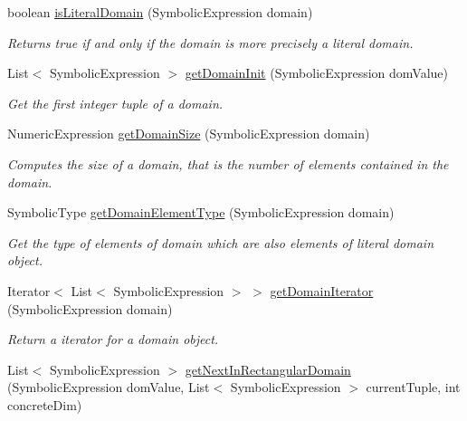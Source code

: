 \begin{DoxyCompactItemize}
boolean \hyperlink{interfaceedu_1_1udel_1_1cis_1_1vsl_1_1civl_1_1dynamic_1_1IF_1_1SymbolicUtility_a1cd347558a2c39a4364292e5c3e9bd32}{is\+Literal\+Domain} (Symbolic\+Expression domain)
\begin{DoxyCompactList}\small\item\em Returns true if and only if the domain is more precisely a literal domain. \end{DoxyCompactList}\item 
List$<$ Symbolic\+Expression $>$ \hyperlink{interfaceedu_1_1udel_1_1cis_1_1vsl_1_1civl_1_1dynamic_1_1IF_1_1SymbolicUtility_a2b4cbf8679e81829e15e2258a48175bd}{get\+Domain\+Init} (Symbolic\+Expression dom\+Value)
\begin{DoxyCompactList}\small\item\em Get the first integer tuple of a domain. \end{DoxyCompactList}\item 
Numeric\+Expression \hyperlink{interfaceedu_1_1udel_1_1cis_1_1vsl_1_1civl_1_1dynamic_1_1IF_1_1SymbolicUtility_a204e44e0a26034113225490137ffbb35}{get\+Domain\+Size} (Symbolic\+Expression domain)
\begin{DoxyCompactList}\small\item\em Computes the size of a domain, that is the number of elements contained in the domain. \end{DoxyCompactList}\item 
Symbolic\+Type \hyperlink{interfaceedu_1_1udel_1_1cis_1_1vsl_1_1civl_1_1dynamic_1_1IF_1_1SymbolicUtility_ac3b51626ccac148a9336b29ee66498fb}{get\+Domain\+Element\+Type} (Symbolic\+Expression domain)
\begin{DoxyCompactList}\small\item\em Get the type of elements of domain which are also elements of literal domain object. \end{DoxyCompactList}\item 
Iterator$<$ List$<$ Symbolic\+Expression $>$ $>$ \hyperlink{interfaceedu_1_1udel_1_1cis_1_1vsl_1_1civl_1_1dynamic_1_1IF_1_1SymbolicUtility_af7ac99e4c2cf626eba58cc25dd707b37}{get\+Domain\+Iterator} (Symbolic\+Expression domain)
\begin{DoxyCompactList}\small\item\em Return a iterator for a domain object. \end{DoxyCompactList}\item 
List$<$ Symbolic\+Expression $>$ \hyperlink{interfaceedu_1_1udel_1_1cis_1_1vsl_1_1civl_1_1dynamic_1_1IF_1_1SymbolicUtility_a9ba051e6cf7a907d0dbeb99a253660b6}{get\+Next\+In\+Rectangular\+Domain} (Symbolic\+Expression dom\+Value, List$<$ Symbolic\+Expression $>$ current\+Tuple, int concrete\+Dim)

\end{DoxyCompactItemize}
